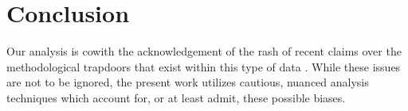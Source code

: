 \section{Conclusion}

Our analysis is cowith the acknowledgement of the rash of recent claims over the methodological trapdoors that exist within this type of data \cite{tufekci_big_2014,ruths_social_2014,joseph_approach_2014,morstatter_is_2013}. While these issues are not to be ignored, the present work utilizes cautious, nuanced analysis techniques which account for, or at least admit, these possible biases. 